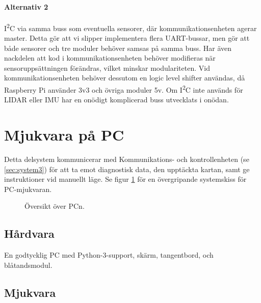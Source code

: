 \documentclass[a4paper,11pt]{article}
\begin{document}
\paragraph{Alternativ 2}
I\textsuperscript{2}C via samma buss som eventuella sensorer, där kommunikationsenheten agerar master. Detta gör att vi slipper implementera flera UART-bussar, men gör att både sensorer och tre moduler behöver samsas på samma buss. Har även nackdelen att kod i kommunikationsenheten behöver modifieras när sensoruppsättningen förändras, vilket minskar modulariteten.
Vid kommunikationsenheten behöver dessutom en logic level shifter användas, då Raspberry Pi använder 3v3 och övriga moduler 5v. Om I\textsuperscript{2}C inte används för LIDAR eller IMU har en onödigt komplicerad buss utvecklats i onödan.

\newpage
\section{ Mjukvara på PC} \label{sec:system4}
Detta delsystem kommunicerar med Kommunikations- och kontrollenheten (se \ref{sec:system3}) för att ta emot diagnostisk data, den upptäckta kartan, samt ge instruktioner vid manuellt läge. Se figur \ref{fig:unitPC} för en övergripande systemskiss för PC-mjukvaran.

\begin{figure}[h!]
    \caption{Översikt över PCn.}
    \label{fig:unitPC}
\end{figure}
\subsection{Hårdvara}
En godtycklig PC med Python-3-support, skärm, tangentbord, och blåtandsmodul.

\subsection{Mjukvara}
\end{document}
